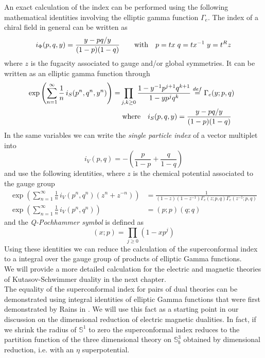 An exact calculation of the index can be performed using the following mathematical identities involving the elliptic gamma function $\Gamma_e$.
The index of a chiral field in general can be written as
\begin{equation}
i_{\Phi} (p,q,y) = \frac{y - pq/y}{(1-p)(1-q)} \qquad \hbox{with} \quad p=tx \; q=t x^{-1} \; y = t^R z 
\end{equation}
where $z$ is the fugacity associated to gauge and/or global symmetries.
It can be written as an elliptic gamma function through
\begin{align}
 \exp \left(  
\sum_{n=1}^{\infty} \frac{1}{n} \, i_S(p^n,q^n,y^n) \right)=
& \prod_{j,k \geq 0} \frac{1 - y^{-1}p^{j+1}q^{k+1}}{1 - y p^j q^k}
\overset{def}{=} 
\Gamma_e ( y; p, q) 
\\
& \; \hbox{where} \quad i_S(p,q,y) = \frac{y - pq/y}{(1-p)(1-q)} \quad
\end{align}
In the same variables we can write the \emph{single particle index} of a vector multiplet into
\begin{equation}
i_V(p,q) = - \left( \frac{p}{1-p} + \frac{q}{1-q} \right)
\end{equation}
and use the following identities, where $z$ is the chemical potential associated to the gauge group
\begin{align}
\exp \left(  
\sum_{n=1}^{\infty} \frac{1}{n}\, i_V(p^n,q^n) ( z^n + z^{-n}) \right) & = \frac{1}{(1-z)(1-z^{-1}) \Gamma_e(z;p,q) \Gamma_e(z^{-1};p,q)}
\\
\exp \left(
\sum_{n=1}^{\infty} \frac{1}{n} \, i_V(p^n,q^n) \right) & = (p;p) (q;q)
\end{align}
and the \emph{Q-Pochhammer symbol} is defined as
\begin{equation}
(x;p) = \prod_{j \geq 0} ( 1- x p^j)
\end{equation}
Using these identities we can reduce the calculation of the superconformal index to a integral over the gauge group of products of elliptic Gamma functions.\\
We will provide a more detailed calculation for the electric and magnetic theories of Kutasov-Schwimmer duality in the next chapter.
\\
The equality of the superconformal index for pairs of dual theories can be demonstrated using integral identities of elliptic Gamma functions that were first demonstrated by Rains in \cite{rains309252transformations}.
We will use this fact as a starting point in our discussion on the dimensional reduction of electric magnetic dualities.
In fact, if we shrink the radius of $\mathbb{S}^1 $ to zero the superconformal index reduces to the partition function of the three dimensional theory on $\mathbb{S}_b^3$ obtained by dimensional reduction, i.e. with an $\eta$ superpotential.\\

